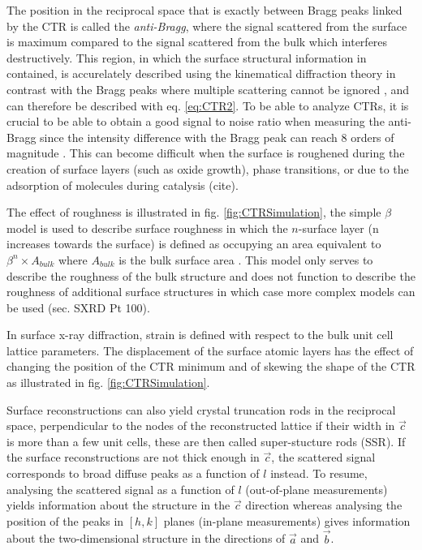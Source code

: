 The position in the reciprocal space that is exactly between Bragg peaks linked by the CTR is called the \textit{anti-Bragg}, where the signal scattered from the surface is maximum compared to the signal scattered from the bulk which interferes destructively.
This region, in which the surface structural information in contained, is accurelately described using the kinematical diffraction theory in contrast with the Bragg peaks where multiple scattering cannot be ignored \parencite{Kaganer2007}, and can therefore be described with eq. \ref{eq:CTR2}.
To be able to analyze CTRs, it is crucial to be able to obtain a good signal to noise ratio when measuring the anti-Bragg since the intensity difference with the Bragg peak can reach 8 orders of magnitude \parencite{Fadenberger2010InSO}.
This can become difficult when the surface is roughened during the creation of surface layers (such as oxide growth), phase transitions, or due to the adsorption of molecules during catalysis (cite).

The effect of roughness is illustrated in fig. \ref{fig:CTRSimulation}, the simple $\beta$ model is used to describe surface roughness in which the $n$-surface layer (n increases towards the surface) is defined as occupying an area equivalent to $\beta^n \times A_{bulk}$ where $A_{bulk}$ is the bulk surface area \parencite{Robinson1986}.
This model only serves to describe the roughness of the bulk structure and does not function to describe the roughness of additional surface structures in which case more complex models can be used (sec. SXRD Pt 100).

In surface x-ray diffraction, strain is defined with respect to the bulk unit cell lattice parameters.
The displacement of the surface atomic layers has the effect of changing the position of the CTR minimum and of skewing the shape of the CTR as illustrated in fig. \ref{fig:CTRSimulation}.

Surface reconstructions can also yield crystal truncation rods in the reciprocal space, perpendicular to the nodes of the reconstructed lattice if their width in $\vec{c}$ is more than a few unit cells, these are then called super-stucture rods (SSR).
If the surface reconstructions are not thick enough in $\vec{c}$, the scattered signal corresponds to broad diffuse peaks as a function of $l$ instead.
To resume, analysing the scattered signal as a function of $l$ (out-of-plane measurements) yields information about the structure in the $\vec{c}$ direction whereas analysing the position of the peaks in $[h, k]$ planes (in-plane measurements) gives information about the two-dimensional structure in the directions of $\vec{a}$ and $\vec{b}$.

